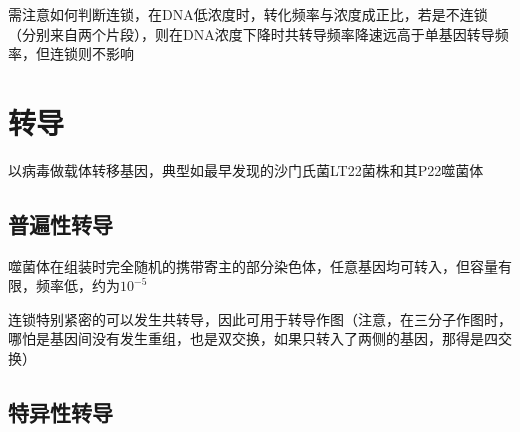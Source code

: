 \documentclass[a4paper, 12pt]{report}
\begin{document}
  需注意如何判断连锁，在DNA低浓度时，转化频率与浓度成正比，若是不连锁（分别来自两个片段），则在DNA浓度下降时共转导频率降速远高于单基因转导频率，但连锁则不影响
  \section{转导}
  以病毒做载体转移基因，典型如最早发现的沙门氏菌LT22菌株和其P22噬菌体
  \subsection{普遍性转导}
  噬菌体在组装时完全随机的携带寄主的部分染色体，任意基因均可转入，但容量有限，频率低，约为\(10^{-5}\)

  连锁特别紧密的可以发生共转导，因此可用于转导作图（注意，在三分子作图时，哪怕是基因间没有发生重组，也是双交换，如果只转入了两侧的基因，那得是四交换）
  \subsection{特异性转导}
  
\end{document}
